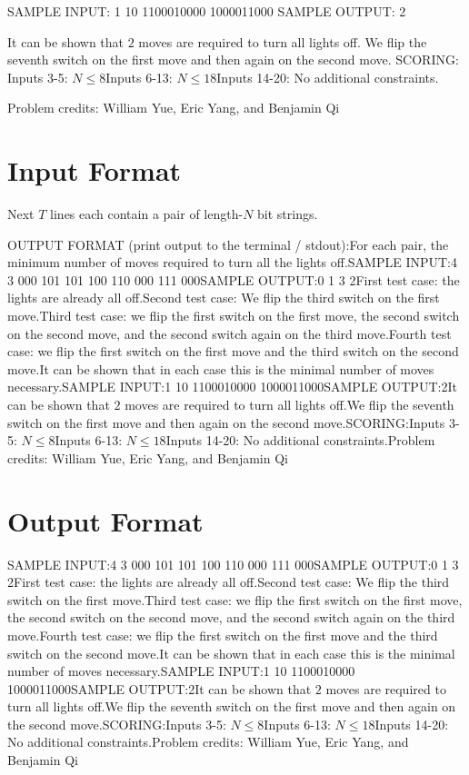 \documentclass[12pt]{article}
\begin{document}
SAMPLE INPUT:
1 10
1100010000 1000011000
SAMPLE OUTPUT: 
2

It can be shown that $2$ moves are required to turn all lights off.
 We flip the seventh switch on the first move and then again on the second
move. 
SCORING:
Inputs 3-5: $N \le 8$Inputs 6-13: $N\le 18$Inputs 14-20: No additional constraints.


Problem credits: William Yue, Eric Yang, and Benjamin Qi



\section*{Input Format}
Next $T$ lines each contain a pair of length-$N$ bit strings.

OUTPUT FORMAT (print output to the terminal / stdout):For each pair, the minimum number of moves required to turn all the lights off.SAMPLE INPUT:4 3
000 101
101 100
110 000
111 000SAMPLE OUTPUT:0
1
3
2First test case: the lights are already all off.Second test
case: We flip the third switch on the first move.Third test case: we
flip the first switch on the first move, the second switch on the second move,
and the second switch again on the third move.Fourth test case: we
flip the first switch on the first move and the third switch on the second move.It can be shown that in each case this is the minimal number of moves necessary.SAMPLE INPUT:1 10
1100010000 1000011000SAMPLE OUTPUT:2It can be shown that $2$ moves are required to turn all lights off.We flip the seventh switch on the first move and then again on the second
move.SCORING:Inputs 3-5: $N \le 8$Inputs 6-13: $N\le 18$Inputs 14-20: No additional constraints.Problem credits: William Yue, Eric Yang, and Benjamin Qi

\section*{Output Format}
SAMPLE INPUT:4 3
000 101
101 100
110 000
111 000SAMPLE OUTPUT:0
1
3
2First test case: the lights are already all off.Second test
case: We flip the third switch on the first move.Third test case: we
flip the first switch on the first move, the second switch on the second move,
and the second switch again on the third move.Fourth test case: we
flip the first switch on the first move and the third switch on the second move.It can be shown that in each case this is the minimal number of moves necessary.SAMPLE INPUT:1 10
1100010000 1000011000SAMPLE OUTPUT:2It can be shown that $2$ moves are required to turn all lights off.We flip the seventh switch on the first move and then again on the second
move.SCORING:Inputs 3-5: $N \le 8$Inputs 6-13: $N\le 18$Inputs 14-20: No additional constraints.Problem credits: William Yue, Eric Yang, and Benjamin Qi
\end{document}
